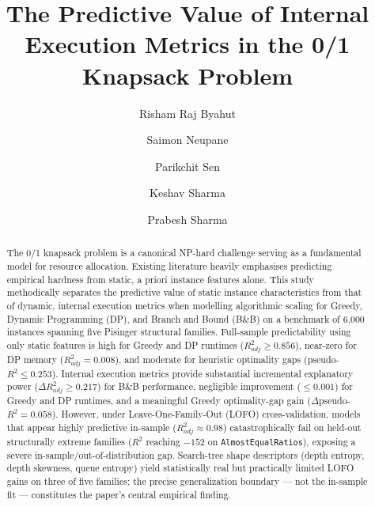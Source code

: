 \documentclass[sigconf]{acmart}
\begin{document}
\title{The Predictive Value of Internal Execution Metrics in the 0/1 Knapsack Problem}

\author{Risham Raj Byahut}

\author{Saimon Neupane}

\author{Parikchit Sen}

\author{Keshav Sharma}

\author{Prabesh Sharma}

\renewcommand{\shortauthors}{Byahut et al.}

\begin{abstract}
The 0/1 knapsack problem is a canonical NP-hard challenge serving
as a fundamental model for resource allocation. Existing literature heavily
emphasises predicting empirical hardness from static, a priori instance features
alone. This study methodically separates the predictive value of static instance
characteristics from that of dynamic, internal execution metrics when modelling
algorithmic scaling for Greedy, Dynamic Programming (DP), and Branch and Bound (B\&B)
on a benchmark of 6,000 instances spanning five Pisinger structural families.
Full-sample predictability using only static features is high for Greedy and DP
runtimes ($R^2_{adj} \ge 0.856$), near-zero for DP memory ($R^2_{adj} = 0.008$),
and moderate for heuristic optimality gaps (pseudo-$R^2 \le 0.253$). Internal execution
metrics provide substantial incremental explanatory power ($\Delta R^2_{adj} \ge 0.217$)
for B\&B performance, negligible improvement ($\le 0.001$) for Greedy and DP runtimes,
and a meaningful Greedy optimality-gap gain ($\Delta$pseudo-$R^2 = 0.058$).
However, under Leave-One-Family-Out (LOFO) cross-validation, models that appear
highly predictive in-sample ($R^2_{adj} \approx 0.98$) catastrophically fail
on held-out structurally extreme families ($R^2$ reaching $-152$ on
\texttt{AlmostEqualRatios}), exposing a severe in-sample/out-of-distribution gap.
Search-tree shape descriptors (depth entropy, depth skewness, queue entropy)
yield statistically real but practically limited LOFO gains on three of five
families; the precise generalization boundary --- not the in-sample fit ---
constitutes the paper's central empirical finding.
\end{abstract}
\end{document}
